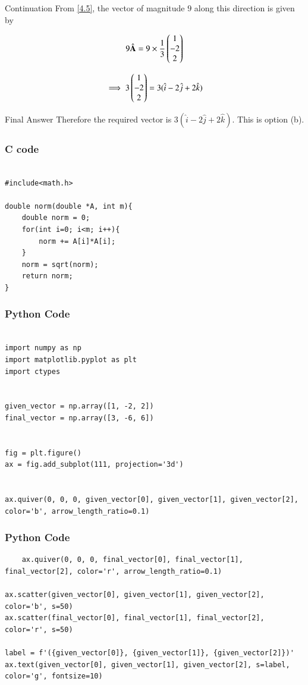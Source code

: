 \documentclass{beamer}
\begin{document}
\begin{frame}{Continuation}
From \ref{4.5}, the vector of magnitude $9$ along this direction is given by

\begin{align}
    9\hat{\textbf{A}} = 9 \times \frac{1}{3}\begin{pmatrix}1 \\ -2 \\ 2\end{pmatrix}
    \label{4.6}
\end{align}

\begin{align}
    \implies 3\begin{pmatrix}1 \\ -2 \\ 2\end{pmatrix} = 3(\hat{i}-2\hat{j}+2\hat{k})
    \label{4.7}
\end{align}
\end{frame}


\begin{frame}{Final Answer}
Therefore the required vector is $3(\hat{i}-2\hat{j}+2\hat{k})$. This is option (b).\\
\end{frame}

\begin{frame}[fragile]
\frametitle{C code}
\begin{lstlisting}

#include<math.h>

double norm(double *A, int m){
	double norm = 0;
	for(int i=0; i<m; i++){
		norm += A[i]*A[i];
	}
	norm = sqrt(norm);
	return norm;
}

\end{lstlisting}
\end{frame}

\begin{frame}[fragile]
\frametitle{Python Code}
    \begin{lstlisting}

import numpy as np
import matplotlib.pyplot as plt
import ctypes 


given_vector = np.array([1, -2, 2])
final_vector = np.array([3, -6, 6])


fig = plt.figure()
ax = fig.add_subplot(111, projection='3d')


ax.quiver(0, 0, 0, given_vector[0], given_vector[1], given_vector[2], color='b', arrow_length_ratio=0.1)

\end{lstlisting}
\end{frame}

\begin{frame}[fragile]
\frametitle{Python Code}
\begin{lstlisting}
    ax.quiver(0, 0, 0, final_vector[0], final_vector[1], final_vector[2], color='r', arrow_length_ratio=0.1)

ax.scatter(given_vector[0], given_vector[1], given_vector[2], color='b', s=50)
ax.scatter(final_vector[0], final_vector[1], final_vector[2], color='r', s=50)

label = f'({given_vector[0]}, {given_vector[1]}, {given_vector[2]})'
ax.text(given_vector[0], given_vector[1], given_vector[2], s=label, color='g', fontsize=10)

\end{lstlisting}
\end{frame}
\end{document}
